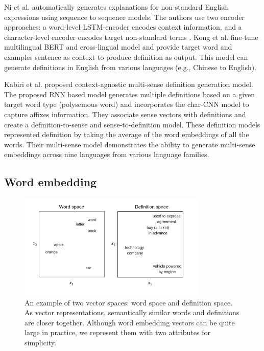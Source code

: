 Ni et al. \cite{ni_learning_2017} automatically generates explanations for
non-standard English expressions using sequence to sequence models. The authors
use two encoder approaches: a word-level LSTM-encoder encodes context information, and a character-level encoder encodes target non-standard terms
\cite{ni_learning_2017}. Kong et al. \cite{kong_toward_2020} fine-tune multilingual BERT and cross-lingual model and provide target word and examples sentence as context
to produce definition as output. This model can generate definitions in English
from various languages (e.g., Chinese to English).

Kabiri et al. \cite{kabiri_evaluating_2020} proposed context-agnostic
multi-sense definition generation model. The proposed RNN based model generates
multiple definitions based on a given target word type (polysemous word) and
incorporates the char-CNN model to capture affixes information. They associate
sense vectors with definitions and create a definition-to-sense and
sense-to-definition model. These definition models represented definition by
taking the average of the word embeddings of all the words. Their multi-sense
model demonstrates the ability to generate multi-sense embeddings across nine
languages from various language families.

\subsection{Word embedding}

\begin{figure}[h]
    \centering
    \includegraphics[width=0.8\textwidth]{assets/figures/embedding_space.png}
    \caption{An example of two vector spaces: word space and definition space. As vector representations, semantically similar
    words and definitions are closer together. Although word embedding vectors 
    can be quite large in practice, we represent them with two attributes for simplicity.}
    \label{fig:embedding_space}
\end{figure}

